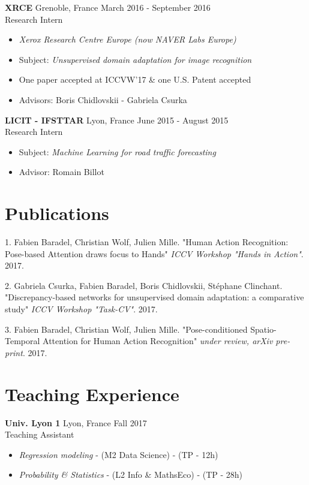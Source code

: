 \documentclass[10pt]{res} %
\begin{document}
\begin{resume}
\textbf{XRCE} \hfill Grenoble, France \hfill March 2016 - September 2016 \\
Research Intern
\begin{itemize}
\item \textit{Xerox Research Centre Europe (now NAVER Labs Europe)}
\item Subject: \textit{Unsupervised domain adaptation for image recognition}
\item One paper accepted at ICCVW'17 \& one U.S. Patent accepted
\item Advisors: Boris Chidlovskii - Gabriela Csurka
\end{itemize}

\textbf{LICIT - IFSTTAR} \hfill Lyon, France \hfill June 2015 - August 2015 \\
Research Intern
\begin{itemize}
\item Subject: \textit{Machine Learning for road traffic forecasting}
\item Advisor: Romain Billot
\end{itemize}



\section{\large Publications} 
1. Fabien Baradel, Christian Wolf, Julien Mille. "Human Action Recognition: Pose-based Attention draws focus to Hands" \textit{ICCV Workshop "Hands in Action"}. 2017.

2. Gabriela Csurka, Fabien Baradel, Boris Chidlovskii, Stéphane Clinchant. "Discrepancy-based networks for unsupervised domain adaptation: a comparative study" \textit{ICCV Workshop "Task-CV"}. 2017.

3. Fabien Baradel, Christian Wolf, Julien Mille. "Pose-conditioned Spatio-Temporal Attention for Human Action Recognition" \textit{under review, arXiv pre-print}. 2017.


\section{\large Teaching Experience} 
\textbf{Univ. Lyon 1} \hfill Lyon, France \hfill Fall 2017 \\
Teaching Assistant
\begin{itemize}
	\item \textit{Regression modeling}  - (M2 Data Science) - (TP - 12h)
	\item \textit{Probability \& Statistics}  - (L2 Info \& MathsEco) - (TP - 28h)
\end{itemize}


\end{resume}
\end{document}
